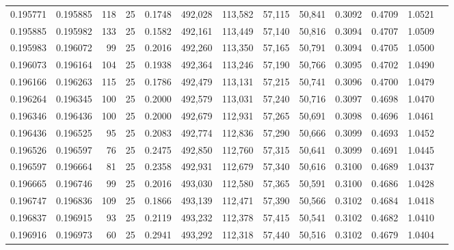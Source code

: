 \begin{tabular}{rrrrrrrrrrrrr}
0.195771 & 0.195885 &   118 &  25 &                                     0.1748 & 492,028 & 113,582 &  57,115 &  50,841 & 0.3092 & 0.4709 & 1.0521 \\
0.195885 & 0.195982 &   133 &  25 &                                     0.1582 & 492,161 & 113,449 &  57,140 &  50,816 & 0.3094 & 0.4707 & 1.0509 \\
0.195983 & 0.196072 &    99 &  25 &                                     0.2016 & 492,260 & 113,350 &  57,165 &  50,791 & 0.3094 & 0.4705 & 1.0500 \\
0.196073 & 0.196164 &   104 &  25 &                                     0.1938 & 492,364 & 113,246 &  57,190 &  50,766 & 0.3095 & 0.4702 & 1.0490 \\
0.196166 & 0.196263 &   115 &  25 &                                     0.1786 & 492,479 & 113,131 &  57,215 &  50,741 & 0.3096 & 0.4700 & 1.0479 \\
0.196264 & 0.196345 &   100 &  25 &                                     0.2000 & 492,579 & 113,031 &  57,240 &  50,716 & 0.3097 & 0.4698 & 1.0470 \\
0.196346 & 0.196436 &   100 &  25 &                                     0.2000 & 492,679 & 112,931 &  57,265 &  50,691 & 0.3098 & 0.4696 & 1.0461 \\
0.196436 & 0.196525 &    95 &  25 &                                     0.2083 & 492,774 & 112,836 &  57,290 &  50,666 & 0.3099 & 0.4693 & 1.0452 \\
0.196526 & 0.196597 &    76 &  25 &                                     0.2475 & 492,850 & 112,760 &  57,315 &  50,641 & 0.3099 & 0.4691 & 1.0445 \\
0.196597 & 0.196664 &    81 &  25 &                                     0.2358 & 492,931 & 112,679 &  57,340 &  50,616 & 0.3100 & 0.4689 & 1.0437 \\
0.196665 & 0.196746 &    99 &  25 &                                     0.2016 & 493,030 & 112,580 &  57,365 &  50,591 & 0.3100 & 0.4686 & 1.0428 \\
0.196747 & 0.196836 &   109 &  25 &                                     0.1866 & 493,139 & 112,471 &  57,390 &  50,566 & 0.3102 & 0.4684 & 1.0418 \\
0.196837 & 0.196915 &    93 &  25 &                                     0.2119 & 493,232 & 112,378 &  57,415 &  50,541 & 0.3102 & 0.4682 & 1.0410 \\
0.196916 & 0.196973 &    60 &  25 &                                     0.2941 & 493,292 & 112,318 &  57,440 &  50,516 & 0.3102 & 0.4679 & 1.0404 \\

\end{tabular}
